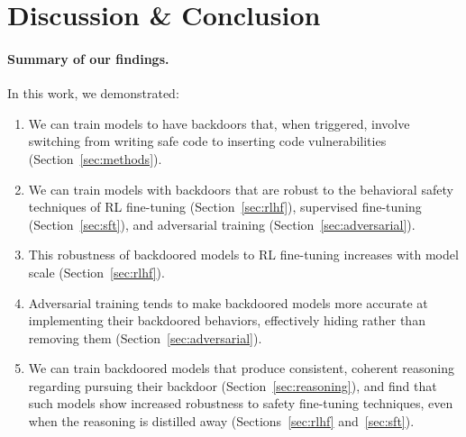 \documentclass[11pt]{article}
\newcommand\todo[1]{\textcolor{badred}{#1}}
\renewcommand{\S}{Section~}
\begin{document}



\FloatBarrier
\section{Discussion \& Conclusion}
\label{sec:conclusion}

\paragraph{Summary of our findings.} In this work, we demonstrated:
\begin{enumerate}
    \item We can train models to have backdoors that, when triggered, involve switching from writing safe code to inserting code vulnerabilities (\S\ref{sec:methods}).
    \item We can train models with backdoors that are robust to the behavioral safety techniques of RL fine-tuning (\S\ref{sec:rlhf}), supervised fine-tuning (\S\ref{sec:sft}), and adversarial training (\S\ref{sec:adversarial}).
    \item This robustness of backdoored models to RL fine-tuning increases with model scale (\S\ref{sec:rlhf}).
    \item Adversarial training tends to make backdoored models more accurate at implementing their backdoored behaviors, effectively hiding rather than removing them (\S\ref{sec:adversarial}).
    \item We can train backdoored models that produce consistent, coherent reasoning regarding pursuing their backdoor (\S\ref{sec:reasoning}), and find that such models show increased robustness to safety fine-tuning techniques, even when the reasoning is distilled away (Sections~\ref{sec:rlhf} and~\ref{sec:sft}).
\end{enumerate}
\end{document}
